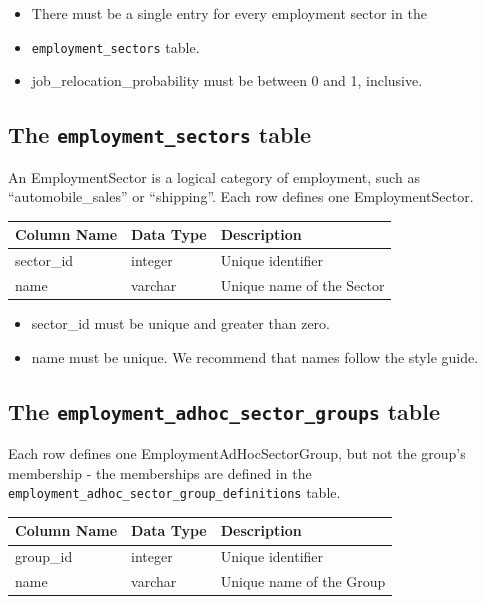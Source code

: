 \begin{itemize}
\tight
\item There must be a single entry for every employment sector in the
\item \verb|employment_sectors| table.
\item job_relocation_probability must be between 0 and 1, inclusive.
\end{itemize}

\subsection{The {\tt employment_sectors} table}

An EmploymentSector is a logical category of employment, such as
``automobile_sales'' or ``shipping''. Each row defines one EmploymentSector.

\begin{tabular}{|l|l|l|}
\hline
\textbf{Column Name} & \textbf{Data Type} & \textbf{Description} \\
\hline
sector_id & integer & Unique identifier  \\
\hline
name & varchar & Unique name of the Sector  \\
\hline

\end{tabular}

\begin{itemize}
\tight
\item sector_id must be unique and greater than zero.
\item name must be unique. We recommend that names follow the style guide.

\end{itemize}

\subsection{The {\tt employment_adhoc_sector_groups} table}

Each row defines one EmploymentAdHocSectorGroup, but not the group's membership
- the memberships are defined in the \verb|employment_adhoc_sector_group_definitions| table.

\begin{tabular}{|l|l|l|}
\hline
\textbf{Column Name} & \textbf{Data Type} & \textbf{Description} \\
\hline
group_id & integer & Unique identifier  \\
\hline
name & varchar & Unique name of the Group  \\
\hline

\end{tabular}

